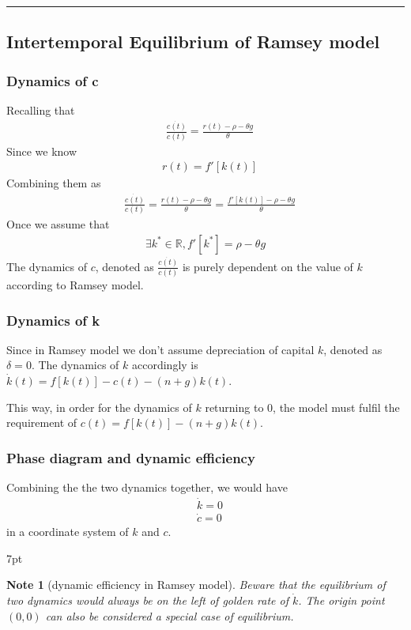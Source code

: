 \documentclass{article}
\newcommand*\sepline{%
  \begin{center}
    \rule[1ex]{.5\textwidth}{.5pt}
  \end{center}}
\newenvironment{blueblock}{
\def\FrameCommand{
  \hspace{1pt}
    {\color{DarkBlue}
    \vrule width 2pt}
    {\color{blueshade}
    \vrule width 4pt}
  \colorbox{blueshade}
}
\MakeFramed{
  \advance
  \hsize-
  \width
  \FrameRestore}
\noindent\hspace{-4.55pt}%
\begin{adjustwidth}{}{7pt}
\vspace{2pt}\vspace{2pt}
}
{\vspace{2pt}\end{adjustwidth}\endMakeFramed}
\newtheorem{note}{Note}
\begin{document}
\sepline
\subsection{Intertemporal Equilibrium of Ramsey model}

\subsubsection{Dynamics of c} 

Recalling that
\begin{align}
&\frac{\dot{c(t)}}{c(t)}=\frac{r(t)-\rho-\theta g}{\theta}
\end{align}
Since we know
\begin{align}
&r(t)=f'[k(t)]
\end{align}
Combining them as
\begin{align}
&\frac{\dot{c(t)}}{c(t)}=\frac{r(t)-\rho-\theta g}{\theta}=\frac{f'[k(t)]-\rho-\theta g}{\theta}
\end{align}
Once we assume that 
\begin{align}
\exists k^{*}\in\mathbb{R},f'[k^{*}]=\rho-\theta g
\end{align}
The dynamics of $c$, denoted as $\frac{\dot{c(t)}}{c(t)}$ is purely dependent on the value of $k$ according to Ramsey model.

\subsubsection{Dynamics of k} 

Since in Ramsey model we don't assume depreciation of capital $k$, denoted as $\delta=0$. The dynamics of $k$ accordingly is $\dot{k}(t)=f[k(t)]-c(t)-(n+g)k(t)$.

This way, in order for the dynamics of $k$ returning to $0$, the
model must fulfil the requirement of $c(t)=f[k(t)]-(n+g)k(t)$.


\subsubsection{Phase diagram and dynamic efficiency}
Combining the the two dynamics together, we would have 
\begin{align}
&\dot{k}=0
\\ &\dot{c}=0
\end{align} 
in a coordinate system of $k$ and $c$.

\begin{blueblock}
\begin{note}[dynamic efficiency in Ramsey model]
Beware that the equilibrium of two dynamics would always be on the left of golden rate of $\dot{k}$.
The origin point $(0,0)$ can also be considered a special case of equilibrium.
\end{note}
\end{blueblock}
\end{document}
